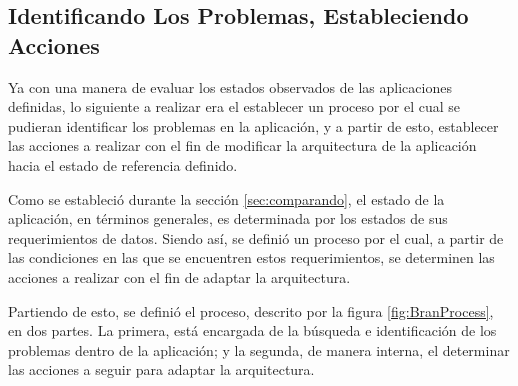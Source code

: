 \subsection{Identificando Los Problemas, Estableciendo Acciones}

Ya con una manera de evaluar los estados observados de las aplicaciones definidas, lo siguiente a realizar era el establecer un proceso por el cual se pudieran identificar los problemas en la aplicación, y a partir de esto, establecer las acciones a realizar con el fin de modificar la arquitectura de la aplicación hacia el estado de referencia definido.

Como se estableció durante la sección \ref{sec:comparando}, el estado de la aplicación, en términos generales, es determinada por los estados de sus requerimientos de datos. Siendo así, se definió un proceso por el cual, a partir de las condiciones en las que se encuentren estos requerimientos, se determinen las acciones a realizar con el fin de adaptar la arquitectura.


Partiendo de esto, se definió el proceso, descrito por la figura \ref{fig:BranProcess}, en dos partes. La primera, está encargada de la búsqueda e identificación de los problemas dentro de la aplicación; y la segunda, de manera interna, el determinar las acciones a seguir para adaptar la arquitectura. 

